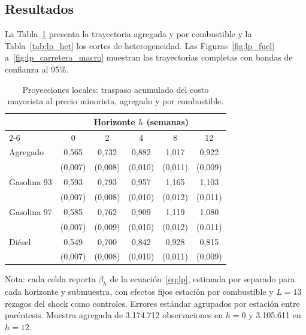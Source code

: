 \documentclass[11pt]{article}
\begin{document}
\subsection{Resultados}
\label{sec:lp_resultados}

La Tabla~\ref{tab:lp_pooled} presenta la trayectoria agregada y por
combustible y la Tabla~\ref{tab:lp_het} los cortes de heterogeneidad. Las
Figuras~\ref{fig:lp_fuel} a~\ref{fig:lp_carretera_macro} muestran las
trayectorias completas con bandas de confianza al 95\%.

\begin{table}[htbp]
\centering
\caption{Proyecciones locales: traspaso acumulado del costo mayorista al
precio minorista, agregado y por combustible.}
\label{tab:lp_pooled}
\begin{tabular}{lccccc}
\toprule
 & \multicolumn{5}{c}{Horizonte $h$ (semanas)} \\
\cmidrule(lr){2-6}
 & 0 & 2 & 4 & 8 & 12 \\
\midrule
Agregado          & 0,565 & 0,732 & 0,882 & 1,017 & 0,922 \\
                  & (0,007) & (0,008) & (0,010) & (0,011) & (0,009) \\
\addlinespace
Gasolina 93       & 0,593 & 0,793 & 0,957 & 1,165 & 1,103 \\
                  & (0,007) & (0,008) & (0,010) & (0,012) & (0,011) \\
Gasolina 97       & 0,585 & 0,762 & 0,909 & 1,119 & 1,080 \\
                  & (0,007) & (0,009) & (0,010) & (0,012) & (0,011) \\
Diésel            & 0,549 & 0,700 & 0,842 & 0,928 & 0,815 \\
                  & (0,007) & (0,008) & (0,010) & (0,011) & (0,009) \\
\bottomrule
\end{tabular}

\medskip
\begin{minipage}{0.92\textwidth}
\footnotesize
Nota: cada celda reporta $\beta_h$ de la ecuación~\eqref{eq:lp}, estimada por
separado para cada horizonte y submuestra, con efectos fijos estación por
combustible y $L = 13$ rezagos del shock como controles. Errores estándar
agrupados por estación entre paréntesis. Muestra agregada de 3.174.712
observaciones en $h = 0$ y 3.105.611 en $h = 12$.
\end{minipage}
\end{table}
\end{document}
